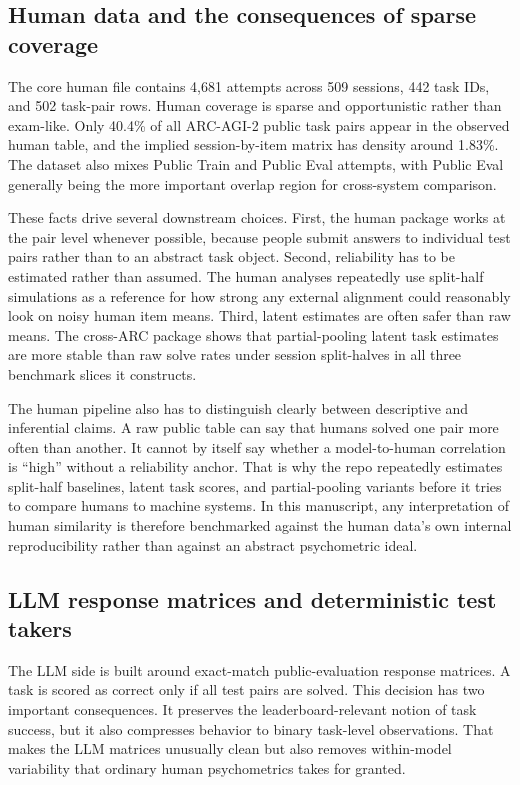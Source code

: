 \documentclass[11pt,letterpaper]{article}
\begin{document}
\subsection{Human data and the consequences of sparse coverage}

The core human file contains 4,681 attempts across 509 sessions, 442 task IDs, and 502 task-pair rows. Human coverage is sparse and opportunistic rather than exam-like. Only 40.4\% of all ARC-AGI-2 public task pairs appear in the observed human table, and the implied session-by-item matrix has density around 1.83\%. The dataset also mixes Public Train and Public Eval attempts, with Public Eval generally being the more important overlap region for cross-system comparison.

These facts drive several downstream choices. First, the human package works at the pair level whenever possible, because people submit answers to individual test pairs rather than to an abstract task object. Second, reliability has to be estimated rather than assumed. The human analyses repeatedly use split-half simulations as a reference for how strong any external alignment could reasonably look on noisy human item means. Third, latent estimates are often safer than raw means. The cross-ARC package shows that partial-pooling latent task estimates are more stable than raw solve rates under session split-halves in all three benchmark slices it constructs.

The human pipeline also has to distinguish clearly between descriptive and inferential claims. A raw public table can say that humans solved one pair more often than another. It cannot by itself say whether a model-to-human correlation is ``high'' without a reliability anchor. That is why the repo repeatedly estimates split-half baselines, latent task scores, and partial-pooling variants before it tries to compare humans to machine systems. In this manuscript, any interpretation of human similarity is therefore benchmarked against the human data's own internal reproducibility rather than against an abstract psychometric ideal.

\subsection{LLM response matrices and deterministic test takers}

The LLM side is built around exact-match public-evaluation response matrices. A task is scored as correct only if all test pairs are solved. This decision has two important consequences. It preserves the leaderboard-relevant notion of task success, but it also compresses behavior to binary task-level observations. That makes the LLM matrices unusually clean but also removes within-model variability that ordinary human psychometrics takes for granted.
\end{document}

